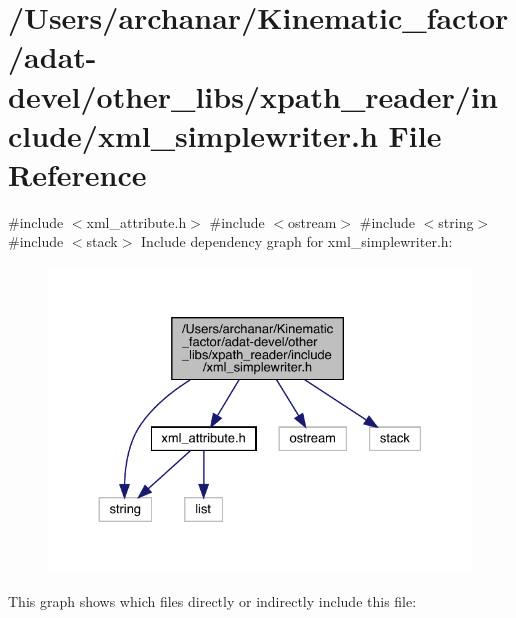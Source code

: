 \hypertarget{adat-devel_2other__libs_2xpath__reader_2include_2xml__simplewriter_8h}{}\section{/\+Users/archanar/\+Kinematic\+\_\+factor/adat-\/devel/other\+\_\+libs/xpath\+\_\+reader/include/xml\+\_\+simplewriter.h File Reference}
\label{adat-devel_2other__libs_2xpath__reader_2include_2xml__simplewriter_8h}
{\ttfamily \#include $<$xml\+\_\+attribute.\+h$>$}\newline
{\ttfamily \#include $<$ostream$>$}\newline
{\ttfamily \#include $<$string$>$}\newline
{\ttfamily \#include $<$stack$>$}\newline
Include dependency graph for xml\+\_\+simplewriter.\+h\+:
\nopagebreak
\begin{figure}[H]
\begin{center}
\leavevmode
\includegraphics[width=330pt]{d5/d4c/adat-devel_2other__libs_2xpath__reader_2include_2xml__simplewriter_8h__incl}
\end{center}
\end{figure}
This graph shows which files directly or indirectly include this file\+:
\nopagebreak
